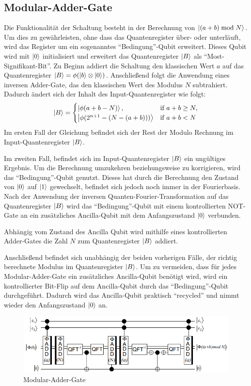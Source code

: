 \documentclass[a4paper,journal]{IEEEtran}
\begin{document}
\subsection{Modular-Adder-Gate}
Die Funktionalität der Schaltung besteht in der Berechnung von
\(\ket{(a+b) \bmod N}\).
Um dies zu gewährleisten, ohne dass das Quantenregister über- oder unterläuft,
wird das Register um ein sogenanntes "`Bedingung"'-Qubit erweitert.
Dieses Qubit wird mit \(\ket{0}\) initialisiert und
erweitert das Quantenregister \(\ket{B}\) als "`Most-Signifikant-Bit"'.
Zu Beginn addiert die Schaltung den klassischen Wert \(a\) auf das Quantenregister
\(\ket{B} = \phi(\ket{b} \otimes \ket{0})\).
Anschließend folgt die Anwendung eines inversen Adder-Gate,
das den klassischen Wert des Modulus \(N\) subtrahiert.
Dadurch ändert sich der Inhalt des Input-Quantenregister wie folgt:
\begin{equation*}
\ket{B} = \begin{cases}
  \ket{\phi(a+b-N)},            & {\text{if}}\ a+b \geq N,\\
  \ket{\phi(2^{n+1}-(N-(a+b)))} & {\text{if}}\ a+b < N
\end{cases}
\end{equation*}
Im ersten Fall der Gleichung befindet sich der Rest der Modulo Rechnung im Input-Quantenregister \(\ket{B}\).

Im zweiten Fall, befindet sich im Input-Quantenregister \(\ket{B}\) ein ungültiges Ergebnis.
Um die Berechnung umzukehren beziehungsweise zu korrigieren,
wird das "`Bedingung"'-Qubit genutzt.
Dieses hat durch die Berechnung den Zustand von \(\ket{0}\) auf \(\ket{1}\) gewechselt,
befindet sich jedoch noch immer in der Fourierbasis.
Nach der Anwendung der inversen Quanten-Fourier-Transformation
auf das Quantenregister \(\ket{B}\) wird das "`Bedingung"'-Qubit
mit einem kontrollierten NOT-Gate an ein zusätzliches Ancilla-Qubit mit dem Anfangszustand \(\ket{0}\) verbunden.

Abhängig vom Zustand des Ancilla Qubit wird mithilfe
eines kontrollierten Adder-Gates die Zahl \(N\) zum Quantenregister \(\ket{B}\) addiert.

Anschließend befindet sich unabhängig der beiden vorherigen Fälle,
der richtig berechnete Modulus im Quantenregister \(\ket{B}\).
Um zu vermeiden, dass für jedes Modular-Adder-Gate ein zusätzliches Ancilla-Qubit benötigt wird,
wird ein kontrollierter Bit-Flip auf dem Ancilla-Qubit durch das "`Bedingung"'-Qubit durchgeführt.
Dadurch wird das Ancilla-Qubit praktisch "`recycled"' und nimmt wieder den Anfangszustand \(\ket{0}\) an.
\begin{figure}[!h]
\caption{Modular-Adder-Gate~\cite{beauregard2003circuit}}
\label{fig:modular_adder_gate}
\includegraphics[width=\linewidth]{modular_adder_gate.PNG}
\centering
\end{figure}
\end{document}

